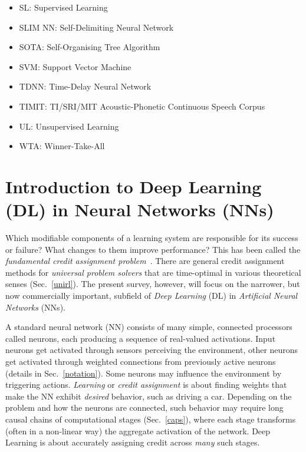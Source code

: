 \documentclass[letterpaper]{article}
\begin{document}
\begin{multicols}{2}
\begin{itemize}[leftmargin=0cm,itemindent=0cm,labelwidth=\itemindent,labelsep=0cm,align=left,noitemsep,nolistsep]
\item[] SL: Supervised Learning 
\item[] SLIM NN: Self-Delimiting  Neural Network  
\item[] SOTA: Self-Organising Tree Algorithm
\item[] SVM: Support Vector Machine 
\item[] TDNN: Time-Delay Neural Network 
\item[] TIMIT: TI/SRI/MIT Acoustic-Phonetic Continuous Speech Corpus
\item[] UL: Unsupervised Learning 
\item[] WTA:  Winner-Take-All   
\end{itemize}
\end{multicols}



\section{Introduction to Deep Learning (DL) in Neural Networks (NNs)}
\label{intro}

Which modifiable components of a learning system are responsible for its success or failure?
What changes to them improve performance? 
This has been called the {\em fundamental credit assignment problem}~\citep{Minsky:63}.
There are general credit assignment methods for {\em universal problem solvers} 
that are 
time-optimal in various theoretical senses
(Sec.~\ref{unirl}).
The present survey, however, will focus on the narrower, but now commercially important, subfield
of {\em Deep Learning} (DL) in {\em Artificial Neural Networks} (NNs).


A standard neural network (NN) consists of many simple, connected
processors called neurons, each producing a sequence of real-valued
activations.  Input neurons get activated through sensors perceiving the
environment, other neurons get activated through weighted 
connections from previously active neurons (details in Sec.~\ref{notation}).  
Some neurons may influence the environment
by triggering actions.  {\em Learning} or {\em credit assignment} is
about finding weights that make the NN exhibit {\em desired} behavior,
such as driving a car.  Depending on the problem and how the neurons
are connected, such behavior may require long causal chains of
computational stages (Sec.~\ref{caps}), where each stage transforms
(often in a non-linear way) the aggregate activation of the
network. Deep Learning is about accurately assigning credit across
{\em many} such stages.
\end{document}
